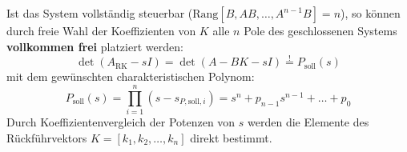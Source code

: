 \begin{tcolorbox}
Ist das System vollständig steuerbar ($\text{Rang}[B, AB, \dots, A^{n-1}B] = n$), so können durch freie Wahl der Koeffizienten von $K$ alle $n$ Pole des geschlossenen Systems \textbf{vollkommen frei} platziert werden:
\[
\det(A_{\text{RK}} - sI) = \det(A - BK - sI) \stackrel{!}{=} P_{\text{soll}}(s)
\]
mit dem gewünschten charakteristischen Polynom:
\[
P_{\text{soll}}(s) = \prod_{i=1}^n (s - s_{P,\text{soll},i}) = s^n + p_{n-1} s^{n-1} + \dots + p_0
\]
Durch Koeffizientenvergleich der Potenzen von $s$ werden die Elemente des Rückführvektors $K = [k_1, k_2, \dots, k_n]$ direkt bestimmt.
\end{tcolorbox}
